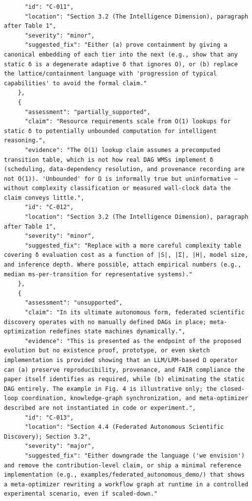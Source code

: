 \documentclass[11pt]{article}
\begin{document}
\begin{verbatim}
      "id": "C-011",
      "location": "Section 3.2 (The Intelligence Dimension), paragraph after Table 1",
      "severity": "minor",
      "suggested_fix": "Either (a) prove containment by giving a canonical embedding of each tier into the next (e.g., show that any static δ is a degenerate adaptive δ that ignores O), or (b) replace the lattice/containment language with 'progression of typical capabilities' to avoid the formal claim."
    },
    {
      "assessment": "partially_supported",
      "claim": "Resource requirements scale from O(1) lookups for static δ to potentially unbounded computation for intelligent reasoning.",
      "evidence": "The O(1) lookup claim assumes a precomputed transition table, which is not how real DAG WMSs implement δ (scheduling, data-dependency resolution, and provenance recording are not O(1)). 'Unbounded' for Ω is informally true but uninformative — without complexity classification or measured wall-clock data the claim conveys little.",
      "id": "C-012",
      "location": "Section 3.2 (The Intelligence Dimension), paragraph after Table 1",
      "severity": "minor",
      "suggested_fix": "Replace with a more careful complexity table covering δ evaluation cost as a function of |S|, |Σ|, |H|, model size, and inference depth. Where possible, attach empirical numbers (e.g., median ms-per-transition for representative systems)."
    },
    {
      "assessment": "unsupported",
      "claim": "In its ultimate autonomous form, federated scientific discovery operates with no manually defined DAGs in place; meta-optimization redefines state machines dynamically.",
      "evidence": "This is presented as the endpoint of the proposed evolution but no existence proof, prototype, or even sketch implementation is provided showing that an LLM/LRM-based Ω operator can (a) preserve reproducibility, provenance, and FAIR compliance the paper itself identifies as required, while (b) eliminating the static DAG entirely. The example in Fig. 4 is illustrative only; the closed-loop coordination, knowledge-graph synchronization, and meta-optimizer described are not instantiated in code or experiment.",
      "id": "C-013",
      "location": "Section 4.4 (Federated Autonomous Scientific Discovery); Section 3.2",
      "severity": "major",
      "suggested_fix": "Either downgrade the language ('we envision') and remove the contribution-level claim, or ship a minimal reference implementation (e.g., examples/federated_autonomous_demo/) that shows a meta-optimizer rewriting a workflow graph at runtime in a controlled experimental scenario, even if scaled-down."

\end{verbatim}
\end{document}
